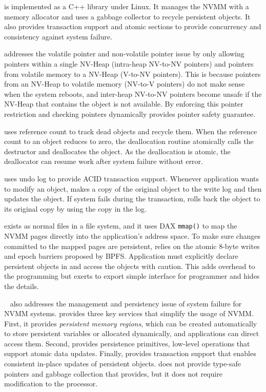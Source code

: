 \nvh{} is implemented as a C++ library under Linux. It manages
the NVMM with a memory allocator and uses a gabbage collector to recycle
persistent objects. It also provides transaction support and atomic sections 
to provide concurrency and consistency against system failure.

\nvh{} addresses the volatile pointer and non-volatile pointer issue by
only allowing pointers within a single NV-Heap (intra-heap NV-to-NV pointers)
and pointers from volatile memory to a NV-Heap (V-to-NV pointers). This is
because pointers from an NV-Heap to volatile memory (NV-to-V pointers) do
not make sense when the system reboots, and inter-heap NV-to-NV pointers become
unsafe if the NV-Heap that contains the object is not available. By enforcing
this pointer restriction and checking pointers dynamically \nvh{} provides
pointer safety guarantee.

\nvh{} uses reference count to track dead objects and recycle them. When 
the reference count to an object reduces to zero, the deallocation routine 
atomically calls the destructor and deallocates the object. As the deallocation
is atomic, the deallocator can resume work after system failure without error.

\nvh{} uses undo log to provide ACID transaction support. Whenever application
wants to modify an object, \nvh{} makes a copy of the original object to
the write log and then updates the object. If system fails during
the transaction, \nvh{} rolls back the object to its original copy by using
the copy in the log.

\nvh{} exists as normal files in a file system, and it uses DAX
\texttt{mmap()} to map the NVMM pages directly into the application's
address space. To make sure changes committed to the mapped pages are
persistent, \nvh{} relies on the atomic 8-byte writes and epoch barriers
proposed by BPFS.
 Application must explicitly declare persistent objects in
\nvh{} and access the objects with caution. This adds overhead to the
programming but \nvh{} exerts to export simple interface for programmer
and hides the details.

\textbf{\mnem{}}~\cite{mnemosyne}
 also addresses the management and persistency issue
of system failure for NVMM systems. \mnem{} provides three key services
that simplify the usage of NVMM. First, it provides \emph{persistent
memory regions}, which can be created automatically to store persistent 
variables or allocated dynamically, and applications can direct access them.
Second, \mnem{} provides persistence
primitives, low-level operations that support atomic data updates. Finally,
\mnem{} provides transaction support that enables consistent in-place
updates of persistent objects. \mnem{} does not provide type-safe pointers
and gabbage collection that \nvh{} provides, but it does not require
modification to the processor.

